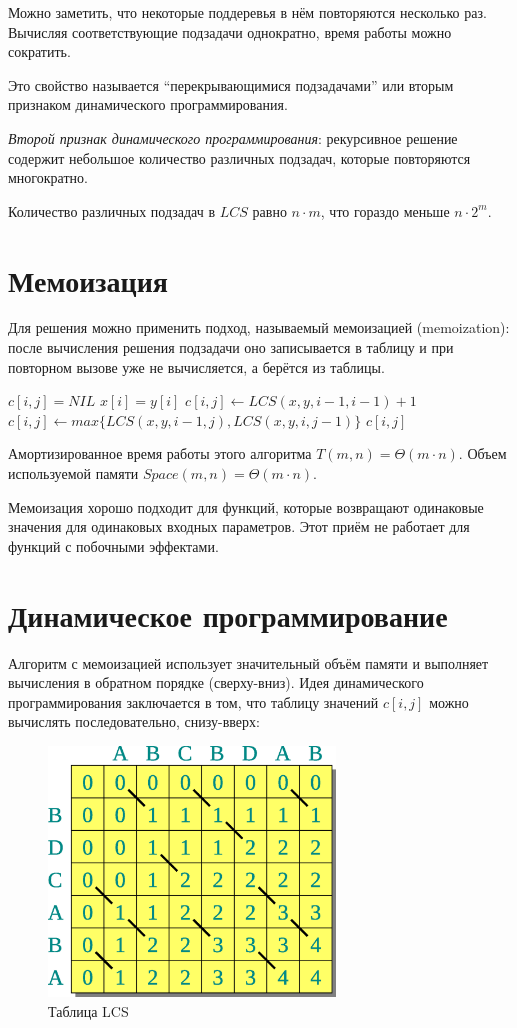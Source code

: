 \documentclass[a4paper,11pt]{article}
\begin{document}
Можно заметить, что некоторые поддеревья в нём повторяются несколько раз.
Вычисляя соответствующие подзадачи однократно, время работы можно сократить.

Это свойство называется ``перекрывающимися подзадачами'' или вторым признаком
динамического программирования.

\emph{Второй признак динамического программирования}: рекурсивное решение
содержит небольшое количество различных подзадач, которые повторяются многократно.

Количество различных подзадач в $LCS$ равно $n \cdot m$, что гораздо меньше
 $n \cdot 2^m$.

\section{Мемоизация}
Для решения можно применить подход, называемый мемоизацией (memoization): после
вычисления решения подзадачи оно записывается в таблицу и при повторном вызове
уже не вычисляется, а берётся из таблицы.

\begin{codebox}
\li \If $c[i,j] = NIL$
\li \Then \If $x[i] = y[i]$
\li     \Then $c[i,j] \gets LCS(x, y, i-1, i-1)+1$
\li     \Else $c[i,j] \gets max\{LCS(x, y, i-1, j), LCS(x, y, i, j-1)\}$
      \End
    \End
\li \Return $c[i,j]$
\end{codebox}
Амортизированное время работы этого алгоритма $T(m, n) = \Theta(m \cdot n)$.
Объем используемой памяти $Space(m, n) = \Theta(m \cdot n)$.

Мемоизация хорошо подходит для функций, которые возвращают одинаковые значения
для одинаковых входных параметров. Этот приём не работает для функций с
побочными эффектами.

\section{Динамическое программирование}
Алгоритм с мемоизацией использует значительный объём памяти и выполняет
вычисления в обратном порядке (сверху-вниз). Идея динамического программирования
заключается в том, что таблицу значений $c[i, j]$ можно вычислять
последовательно, снизу-вверх:
\begin{figure}[h!]
  \centering
  \includegraphics[width=3in]{lecture8/table1.eps}
  \caption{Таблица LCS}
\end{figure}
\end{document}
